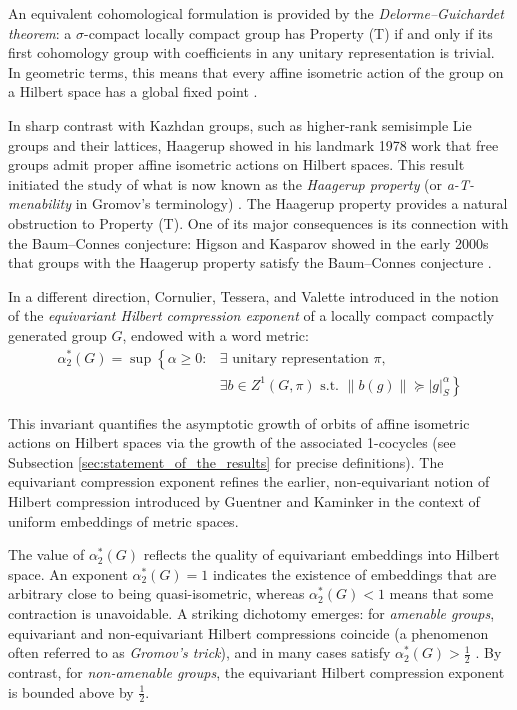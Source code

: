 \documentclass[12pt]{amsart}
\theoremstyle{definition}
\begin{document}
An equivalent cohomological formulation is provided by the
\emph{Delorme--Guichardet theorem}: a \(\sigma\)-compact locally compact
group has Property (T) if and only if its first cohomology group with
coefficients in any unitary representation is trivial. In geometric
terms, this means that every affine isometric action of the group on a
Hilbert space has a global fixed point \cite{Delorme1977}
\cite{Guichardet1977}.

In sharp contrast with Kazhdan groups, such as higher-rank semisimple
Lie groups and their lattices, Haagerup showed in his landmark 1978  work \cite{Haagerup1978}
that free groups admit proper affine isometric actions on Hilbert
spaces. This result initiated the study of what is now known as the
\emph{Haagerup property} (or \emph{a-T-menability} in Gromov's
terminology) \cite{Haagerup1978}. The Haagerup property provides a
natural obstruction to Property (T). One of its major
consequences is its connection with the Baum--Connes conjecture: Higson
and Kasparov showed in the early 2000s that groups with the Haagerup
property satisfy the Baum--Connes conjecture \cite{Higson2001}.

In a different direction, Cornulier, Tessera, and Valette introduced in
\cite{Cornulier2007} the notion of the \emph{equivariant Hilbert
compression exponent} of a locally compact compactly generated group
\(G\), endowed with a word metric: \[\begin{aligned}
\alpha_{2}^*(G)=\sup \left\{\right. \alpha \geq 0: &\exists \text { unitary representation } \pi,\\  
&\exists  b \in Z^1(G, \pi) \text{ s.t. } \left.\|b(g)\| \succeq|g|_S^\alpha\right\}\end{aligned}\]

This invariant quantifies the asymptotic growth of orbits of affine
isometric actions on Hilbert spaces via the growth of the associated
1-cocycles (see Subsection \ref{sec:statement_of_the_results} for
precise definitions). The equivariant compression exponent refines the
earlier, non-equivariant notion of Hilbert compression introduced by
Guentner and Kaminker \cite{Guentner2004} in the context of uniform
embeddings of metric spaces.

The value of \(\alpha_2^*(G)\) reflects the quality of equivariant
embeddings into Hilbert space. An exponent \(\alpha_2^*(G)=1\) indicates
the existence of embeddings that are arbitrary close to being
quasi-isometric, whereas \(\alpha_2^*(G)<1\) means that some contraction
is unavoidable. A striking dichotomy emerges: for \emph{amenable
groups}, equivariant and non-equivariant Hilbert compressions coincide (a
phenomenon often referred to as \emph{Gromov's trick}), and in many
cases satisfy \(\alpha_2^*(G) > \tfrac12\) \cite{Gournay2016}. By
contrast, for \emph{non-amenable groups}, the equivariant Hilbert
compression exponent is bounded above by \(\tfrac12\).
\end{document}
